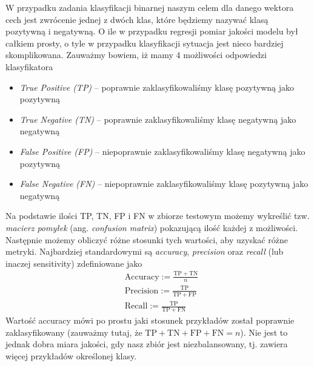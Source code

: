 \documentclass{myclass}
\begin{document}
W przypadku zadania klasyfikacji binarnej naszym celem dla danego wektora cech jest zwrócenie jednej
z dwóch klas, które będziemy nazywać klasą pozytywną i negatywną. O ile w przypadku regresji pomiar
jakości modelu był całkiem prosty, o tyle w przypadku klasyfikacji sytuacja jest nieco bardziej
skomplikowana. Zauważmy bowiem, iż mamy 4 możliwości odpowiedzi klasyfikatora
\begin{itemize}
\item \emph{True Positive (TP)} -- poprawnie zaklasyfikowaliśmy klasę pozytywną jako pozytywną
\item \emph{True Negative (TN)} -- poprawnie zaklasyfikowaliśmy klasę negatywną jako negatywną
\item \emph{False Positive (FP)} -- niepoprawnie zaklasyfikowaliśmy klasę negatywną jako pozytywną
\item \emph{False Negative (FN)} -- niepoprawnie zaklasyfikowaliśmy klasę pozytywną jako negatywną
\end{itemize}

Na podstawie ilości TP, TN, FP i FN w zbiorze testowym możemy wykreślić tzw. \emph{macierz pomyłek}
(ang. \emph{confusion matrix}) pokazującą ilość każdej z możliwości. Następnie możemy obliczyć różne
stosunki tych wartości, aby uzyskać różne metryki. Najbardziej standardowymi są \emph{accuracy},
\emph{precision} oraz \emph{recall} (lub inaczej sensitivity) zdefiniowane jako
\[
\begin{split}
    & \mathrm{Accuracy} := \frac{\mathrm{TP} + \mathrm{TN}}{n}\\
    & \mathrm{Precision} := \frac{\mathrm{TP}}{\mathrm{TP} + \mathrm{FP}}\\
    & \mathrm{Recall} := \frac{\mathrm{TP}}{\mathrm{TP} + \mathrm{FN}}    
\end{split}
\]
Wartość accuracy mówi po prostu jaki stosunek przykładów został poprawnie zaklasyfikowany (zauważmy
tutaj, że \(\mathrm{TP + TN + FP + FN} = n\)). Nie jest to jednak dobra miara jakości, gdy nasz
zbiór jest niezbalansowany, tj. zawiera więcej przykładów określonej klasy.
\end{document}
